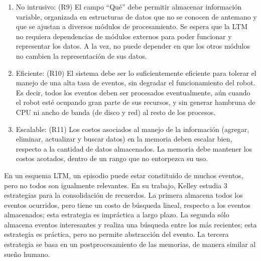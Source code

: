 \begin{enumerate}[topsep=0pt]
	\setlength\itemsep{0.2em}
	\item No intrusivo: (R9) El campo ``Qué'' debe permitir almacenar información variable, organizada en estructuras de datos que no se conocen de antemano y que se ajustan a diversos módulos de procesamiento. Se espera que la LTM no requiera dependencias de módulos externos para poder funcionar y representar los datos. A la vez, no puede depender en que los otros módulos no cambien la representación de sus datos.
	
	\item Eficiente: (R10) El sistema debe ser lo suficientemente eficiente para tolerar el manejo de una alta tasa de eventos, sin degradar el funcionamiento del robot. Es decir, todos los eventos deben ser procesados eventualmente, aún cuando el robot esté ocupando gran parte de sus recursos, y sin generar hambruna de CPU ni ancho de banda (de disco y red) al resto de los procesos.
	
	\item Escalable: (R11) Los costos asociados al manejo de la información (agregar, eliminar, actualizar y buscar datos) en la memoria deben escalar bien, respecto a la cantidad de datos almacenados. La memoria debe mantener los costos acotados, dentro de un rango que no entorpezca su uso.
	
\end{enumerate}


%

En un esquema LTM, un episodio puede estar constituido de muchos eventos, pero no todos son igualmente relevantes. En su trabajo, Kelley \cite{Kelley2014} estudia 3 estrategias para la consolidación de recuerdos. La primera almacena todos los eventos ocurridos, pero tiene un costo de búsqueda lineal, respecto a los eventos almacenados; esta estrategia es impráctica a largo plazo. La segunda sólo almacena eventos interesantes y realiza una búsqueda entre los más recientes; esta estrategia es práctica, pero no permite abstracción del evento. La tercera estrategia se basa en un postprocesamiento de las memorias, de manera similar al sueño humano.

